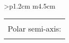 \begin{tabular}{>{\bfseries}p{1.2cm} m{4.5cm}}
\begin{tabular}[t]{|c|}
\begin{longtable}
This is used as:

\begin{teX}
\DotRow{\qquad in feet}{$20,926,062$.}
\end{teX}



\begin{comment}

\begingroup
\centering\small
\fboxsep1em
\fbox{%
\begin{minipage}{0.8\linewidth}

\index{Geographical constants}%
\index{Clarke, A. R.}%
  \footnotetext{Dimensions of the earth are based upon the Clarke spheroid of 1866.}

\index{Dimensions of earth}%
\index{Earth's dimensions}%
\noindent Equatorial semi-axis: \\
\DotRow{\qquad in feet}{$20,926,062$.}
\DotRow{\qquad in meters}{$6,378,206.4$}
\DotRow{\qquad in miles}{$3,963.307$}

\medskip%
\index{Diameter of earth}%
\index{Polar diameter of earth}%
\noindent Polar semi-axis: \\
\DotRow{\qquad in feet}{$20,855,121$.}
\DotRow{\qquad in meters}{$6,356,583.8$}
\DotRow{\qquad in miles}{$3,949.871$}
\DotRow{Oblateness of earth}{$1 294.9784$}
\DotRow{Circumference of equator (in miles)}{$24,901.96$}
\index{Circumference of earth}%
\DotRow{Circumference through poles (in miles)}{$24,859.76$}
\DotRow{Area of earth's surface, square miles}{$196,971,984$.}
\index{Area of earth's surface}%
\DotRow{Volume of earth, cubic miles}{$259,944,035,515$.}
\index{Volume of earth}%
\DotRow{Mean density (Harkness)}{$5.576$}
\index{Harkness, William}%
\index{Density of earth}%
\DotRow{Surface density (Harkness)}{$2.56$}
\DotRow{Obliquity of ecliptic}{$23  27' 4.98$~s.}
\DotRow{Sidereal year}{$365$~d.\ $6$~h.\ $9$~m.\ $8.97$~s.\ or $365.25636$~d.}
\index{Sidereal, clock!year}%
\index{Year}%
\DotRow{Tropical year}{$365$~d.\ $5$~h.\ $48$~m.\ $45.51$~s.\ or $365.24219$~d.}
\DotRow{Sidereal day}{$23$~h.\ $56$~m.\ $4.09$~s.\ of mean solar time.}
\DotRow{Distance of earth to sun, mean (in miles)}{$92,800,000$.}
\DotRow{Distance of earth to moon, mean (in miles)}{$238,840$.}
\index{Distances, of planets}%
\end{minipage}
}

\endgroup
\clearpage

\medskip

One interesting sideline mixing some of the matters discussed in earlier chapters is Table. This table is interesting in that it is not easy to be reproduced without a little bit of tinkering. The table shown in table \ref{tbl:romannumerals} uses some characters that are not easily found in font sets. We need to create these on the fly.



\end{comment}
\end{longtable}
\end{tabular}
\end{tabular}

